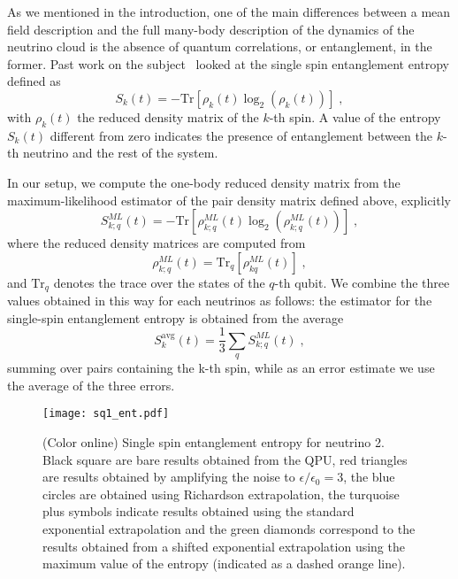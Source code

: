 \documentclass[10pt]{article}
\begin{document}
As we mentioned in the introduction, one of the main differences between a mean field description and the full many-body description of the dynamics of the neutrino cloud is the absence of quantum correlations, or entanglement, in the former. Past work on the subject~\cite{Cervia:2019,Rrapaj2020} looked at the single spin entanglement entropy defined as
\begin{equation}
 S_k(t) = - \text{Tr} \left[{\rho}_k(t)\log_2\left({\rho}_k(t)\right)\right]\;,
\end{equation}
with ${\rho}_k(t)$ the reduced density matrix of the $k$-th spin. A value of the entropy $S_k(t)$ different from zero indicates the presence of entanglement between the $k$-th neutrino and the rest of the system.

In our setup, we compute the one-body reduced density matrix from the maximum-likelihood estimator of the pair density matrix defined above, explicitly
\begin{equation}
S^{ML}_{k;q}(t) = - \text{Tr} \left[{\rho}^{ML}_{k;q}(t)\log_2\left({\rho}^{ML}_{k;q}(t)\right)\right]\;,
\end{equation}
where the reduced density matrices are computed from
\begin{equation}
{\rho}^{ML}_{k;q}(t) = \text{Tr}_q \left[{\rho}^{ML}_{kq}(t)\right]\;,
\end{equation}
and $\text{Tr}_q$ denotes the trace over the states of the $q$-th qubit.
We combine the three values obtained in this way for each neutrinos as follows: the estimator for the single-spin entanglement entropy is obtained from the average 
\begin{equation}
S^{\text{avg}}_k(t) = \frac{1}{3} \sum_{q}S^{ML}_{k;q}(t)\;,
\end{equation}
summing over pairs containing the k-th spin, while as an error estimate we use the average of the three errors.

\begin{figure}
 \centering
 \texttt{[image: sq1\_ent.pdf]}
 \caption{(Color online) Single spin entanglement entropy for neutrino 2. Black square are bare results obtained from the QPU, red triangles are results obtained by amplifying the noise to $\epsilon/\epsilon_0=3$, the blue circles are obtained using Richardson extrapolation, the turquoise plus symbols indicate results obtained using the standard exponential extrapolation and the green diamonds correspond to the results obtained from a shifted exponential extrapolation using the maximum value of the entropy (indicated as a dashed orange line).}
\label{fig:sq_ent1}
\end{figure}
\end{document}
